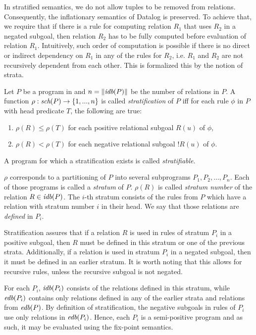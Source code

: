 In stratified semantics, we do not allow tuples to be removed from relations. Consequently, the inflationary semantics of Datalog is preserved. To achieve that, we require that if there is a rule for computing relation $R_1$ that uses $R_2$ in a negated subgoal, then relation $R_2$ has to be fully computed before evaluation of relation $R_1$. Intuitively, such order of computation is possible if there is no direct or indirect dependency on $R_1$ in any of the rules for $R_2$, i.e. $R_1$ and $R_2$ are not recursively dependent from each other. This is formalized this by the notion of strata.

\begin{defn}[Stratification]
Let $P$ be a program in \datalogneg and $n = \|\textit{idb}(P)\|$ be the number of \idb relations in $P$. A function $\rho : \textit{sch}(P) \to \{1, . . . , n\}$ is called \emph{stratification} of $P$ iff for each rule $\phi$ in $P$ with head predicate $T$, the following are true: 

\begin{enumerate}
\item $\rho(R) \le \rho(T)$ for each positive relational subgoal $R(u)$ of $\phi$,
\item $\rho(R) < \rho(T)$ for each negative relational subgoal $!R(u)$ of $\phi$.
\end{enumerate}
\end{defn}

A program for which a stratification exists is called \emph{stratifiable}. 

$\rho$ corresponds to a partitioning of $P$ into several subprograms $P_1, P_2, \dots, P_n$. Each of those programs is called a \emph{stratum} of $P$. $\rho(R)$ is called \emph{stratum number} of the relation $R \in \textit{idb}(P )$. The $i$-th stratum consists of the rules from $P$ which have a relation with stratum number $i$ in their head. We say that those relations are \emph{defined} in $P_i$.

Stratification assures that if a relation $R$ is used in rules of stratum $P_i$ in a positive subgoal, then $R$ must be defined in this stratum or one of the previous strata. Additionally, if a relation is used in stratum $P_i$ in a negated subgoal, then it must be defined in an earlier stratum. It is worth noting that this allows for recursive rules, unless the recursive subgoal is not negated.

For each $P_i$, $\textit{idb}(P_i)$ consists of the relations defined in this stratum, while $\textit{edb}(P_i)$ contains only relations defined in any of the earlier strata and relations from $\textit{edb}(P)$. By definition of stratification, the negative subgoals in rules of $P_i$ use only relations in $\textit{edb}(P_i)$. Hence, each $P_i$ is a semi-positive program and as such, it may be evaluated using the fix-point semantics.

